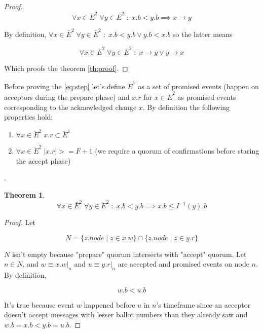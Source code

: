 \documentclass[12pt]{article}
\newtheorem{theorem}{Theorem}
\theoremstyle{definition}
\begin{document}
\begin{appendices}
\begin{proof}
  \begin{equation}
    \forall x \in \bar{E}^2 \; \forall y \in \bar{E}^2 \;:\; x.b < y.b \implies x \to y
  \end{equation}

  By definition, $\forall x \in \bar{E}^2 \; \forall y \in \bar{E}^2 \;:\; x.b < y.b \lor y.b < x.b$ so the latter means

  \begin{equation}
    \forall x \in \bar{E}^2 \; \forall y \in \bar{E}^2 \;:\; x \to y \lor y \to x
  \end{equation}

  Which proofs the theorem \ref{th:proof}.
\end{proof}

Before proving the \ref{eq:step} let's define $\ddot{E}^1$ as a set of promised events (happen on acceptors during the prepare phase) and $x.r$ for $x \in \ddot{E}^2$ as promised events corresponding to the acknowledged change $x$. By definition the following properties hold:
\begin{enumerate}
  \item $\forall x \in \ddot{E}^2 \; x.r \subset \ddot{E}^1$
  \item $\forall x \in \ddot{E}^2 \; |x.r| >= F+1$ (we require a quorum of confirmations before staring the accept phase)
\end{enumerate}.

\begin{theorem} \label{th:proof2}
  $$\forall x \in \bar{E}^2 \; \forall y \in \ddot{E}^2 \;:\; x.b < y.b \implies x.b \leq I^{-1}(y).b$$
\end{theorem}

\begin{proof}
  Let
  
  $$N = \{z.node \;|\; z \in x.w\} \cap \{z.node \;|\; z \in y.r\}$$

  $N$ isn't empty because "prepare" quorum intersects with "accept" quorum. Let $n \in N$, and $w \equiv x.w |_n$ and $u \equiv y.r |_n$ are accepted and promised events on node $n$. By definition,

  \begin{equation}
    w.b < u.b
  \end{equation}
  
  It's true because event $w$ happened before $u$ in $n$'s timeframe since an acceptor doesn't accept messages with lesser ballot numbers than they already saw and $w.b = x.b < y.b = u.b$.


\end{proof}
\end{appendices}
\end{document}
